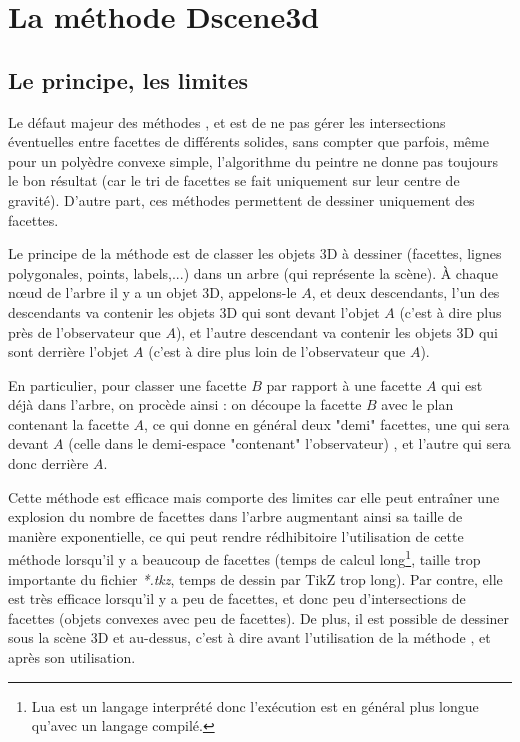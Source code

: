 \section{La méthode Dscene3d}

\subsection{Le principe, les limites}

Le défaut majeur des méthodes ,  et  est de ne pas gérer les intersections éventuelles entre facettes de différents solides, sans compter que parfois, même pour un polyèdre convexe simple, l'algorithme du peintre ne donne pas toujours le bon résultat (car le tri de facettes se fait uniquement sur leur centre de gravité). D'autre part, ces méthodes permettent de dessiner uniquement des facettes.

Le principe de la méthode  est de classer les objets 3D à dessiner (facettes, lignes polygonales, points, labels,...) dans un arbre (qui représente la scène). À chaque nœud de l'arbre il y a un objet 3D, appelons-le $A$, et deux descendants, l'un des descendants va contenir les objets 3D qui sont devant l'objet $A$ (c'est à dire plus près de l'observateur que $A$), et l'autre descendant va contenir les objets 3D qui sont derrière l'objet $A$ (c'est à dire plus loin de l'observateur que $A$).

En particulier, pour classer une facette $B$ par rapport à une facette $A$ qui est déjà dans l'arbre, on procède ainsi : on découpe la facette $B$ avec le plan contenant la facette $A$, ce qui donne en général deux "demi" facettes, une qui sera devant $A$ (celle dans le demi-espace "contenant" l'observateur) , et l'autre qui sera donc derrière $A$.

Cette méthode est efficace mais comporte des limites car elle peut entraîner une explosion du nombre de facettes dans l'arbre augmentant ainsi sa taille de manière exponentielle, ce qui peut rendre rédhibitoire l'utilisation de cette méthode lorsqu'il y a beaucoup de facettes (temps de calcul long\footnote{Lua est un langage interprété donc l'exécution est en général plus longue qu'avec un langage compilé.}, taille trop importante du fichier \emph{*.tkz}, temps de dessin par TikZ trop long). Par contre, elle est très efficace lorsqu'il y a peu de facettes, et donc peu d'intersections de facettes (objets convexes avec peu de facettes). De plus, il est possible de dessiner sous la scène 3D et au-dessus, c'est à dire avant l'utilisation de la méthode , et après son utilisation.

